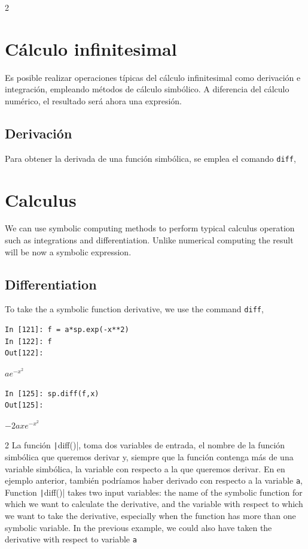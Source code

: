 \begin{paracol}{2}
\section{Cálculo infinitesimal}
Es posible realizar operaciones típicas del cálculo infinitesimal como derivación e integración, empleando métodos de cálculo simbólico. A diferencia del cálculo numérico, el resultado será ahora una expresión.
\subsection{Derivación}
Para obtener la derivada de una función simbólica, se emplea el comando \texttt{diff},
\switchcolumn
\section{Calculus}
We can use symbolic computing methods to perform typical calculus operation such as integrations and differentiation. Unlike numerical computing the result will be now a symbolic expression.  
\subsection{Differentiation}
To take the  a symbolic function derivative, we use the command \texttt{diff},
\end{paracol}

\begin{center}
	\begin{minipage}{.5\textwidth}
		\begin{verbatim}
In [121]: f = a*sp.exp(-x**2)
In [122]: f
Out[122]:
		\end{verbatim}
$ae^{-x^2}$
		\begin{verbatim}
In [125]: sp.diff(f,x)
Out[125]: 
\end{verbatim}
$-2axe^{-x^2}$
	\end{minipage}
\end{center}

\begin{paracol}{2}
La función \texttt|diff()|, toma dos variables de entrada, el nombre de la función simbólica que queremos derivar y, siempre que la función contenga más de una variable simbólica, la variable con respecto a la que queremos derivar. En en ejemplo anterior, también podríamos haber derivado con respecto a la variable \texttt{a},
\switchcolumn
Function \texttt|diff()| takes two input variables: the name of the symbolic function for which we want to calculate the derivative, and the variable with respect to which we want to take the derivative, especially when the function has more than one symbolic variable. In the previous example, we could also have taken the derivative with respect to variable \texttt{a} 
\end{paracol}

